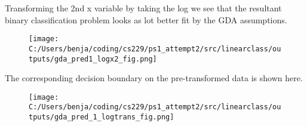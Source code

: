 %
%
\begin{answer}
	Transforming the 2nd x variable by taking the log we see that the resultant binary classification problem looks as lot better fit by the GDA assumptions.
	\begin{figure}[H]
	\texttt{[image: C:/Users/benja/coding/cs229/ps1\_attempt2/src/linearclass/outputs/gda\_pred1\_logx2\_fig.png]}
	\end{figure}

The corresponding decision boundary on the pre-transformed data is shown here.

	\begin{figure}[H]
	\texttt{[image: C:/Users/benja/coding/cs229/ps1\_attempt2/src/linearclass/outputs/gda\_pred\_1\_logtrans\_fig.png]}
\end{figure}
\end{answer}
%